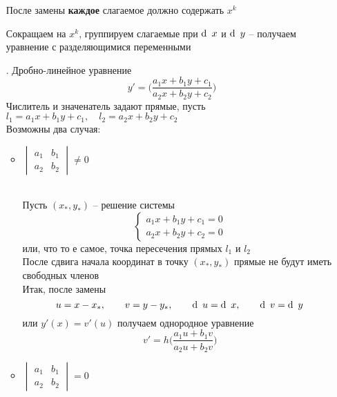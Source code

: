 \begin{enumerate}
    \begin{control}
        После замены \textbf{каждое} слагаемое должно содержать $ x^k $
    \end{control}
    Сокращаем на $ x^k $, группируем слагаемые при $ \di x $ и $ \di y $ -- получаем уравнение с разделяющимися переменными
    \item[\rom7.] Дробно-линейное уравнение
    $$ y' = \bigg( \frac{a_1x + b_1y + c_1}{a_2x + b_2y + c_2} \bigg) $$
    Числитель и значенатель задают прямые, пусть $ l_1 = a_1x + b_1y + c_1, \quad l_2 = a_2x + b_2y + c_2 $ \\
    Возможны два случая:
    \begin{itemize}
    	\item $
        \begin{vmatrix}
        	a_1 & b_1 \\
            a_2 & b_2
        \end{vmatrix} \ne 0 $
        \begin{figure}[!ht]
        \end{figure} \\
        Пусть $ (x_*, y_*) $ -- решение системы
        $$
        \begin{cases}
        	a_1x + b_1y + c_1 = 0 \\
            a_2x + b_2y + c_2 = 0
        \end{cases} $$
        или, что то е самое, точка пересечения прямых $ l_1 $ и $ l_2 $ \\
        После сдвига начала координат в точку $ (x_*, y_*) $ прямые не будут иметь свободных членов \\
        Итак, после замены
        $$ u = x - x_*, \qquad v = y - y_*, \qquad \di u = \di x, \qquad \di v = \di y $$
        или $ y'(x) = v'(u) $ получаем однородное уравнение
        $$ v' = h \bigg( \frac{a_1u + b_1v}{a_2u + b_2v} \bigg) $$
        \item $
        \begin{vmatrix}
        	a_1 & b_1 \\
            a_2 & b_2
        \end{vmatrix} = 0 $

\end{itemize}
\end{enumerate}
